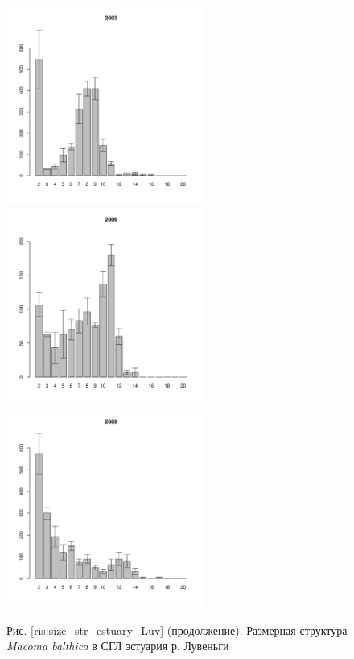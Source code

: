 \documentclass[12pt, a4paper]{article}
\begin{document}
\begin{figure}[h]
\begin{multicols}{3}
\hfill
\includegraphics[width=65mm]{../White_Sea/Estuatiy_Luvenga/sizestr2_2003_.pdf}
\hfill
\includegraphics[width=65mm]{../White_Sea/Estuatiy_Luvenga/sizestr2_2006_.pdf}
\hfill
\includegraphics[width=65mm]{../White_Sea/Estuatiy_Luvenga/sizestr2_2009_.pdf}
\end{multicols}



\begin{center}
Рис. \ref{ris:size_str_estuary_Luv} (продолжение). Размерная структура {\it Macoma balthica} в СГЛ эстуария р. Лувеньги

\end{center}
\end{figure}
\end{document}
